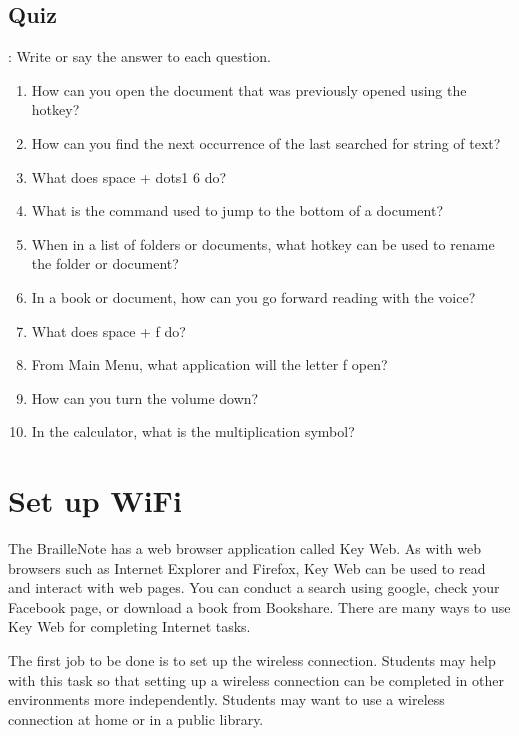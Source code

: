 \documentclass[10pt,letterpaper,twoside]{report}
\begin{document}
\subsection{Quiz}:
Write or say the answer to each question.
\begin{enumerate}
	\item How can you open the document that was previously opened using the hotkey?
	\item How can you find the next occurrence of the last searched for string of text?
	\item What does space + dots1 6 do?
	\item What is the command used to jump to the bottom of a document?
	\item When in a list of folders or documents, what hotkey can be used to rename the folder or document?
	\item In a book or document, how can you go forward reading with the voice?
	\item What does space + f do?
	\item From Main Menu, what application will the letter f open?
	\item How can you turn the volume down?
	\item In the calculator, what is the multiplication symbol?
\end{enumerate}
\clearpage
\section{Set up WiFi}
The BrailleNote has a web browser application called Key Web. As with web browsers such as Internet Explorer and Firefox, Key Web can be used to read and interact with web pages. You can conduct a search using google, check your Facebook page, or download a book from Bookshare. There are many ways to use Key Web for completing Internet tasks.

The first job to be done is to set up the wireless connection. Students may help with this task so that setting up a wireless connection can be completed in other environments more independently. Students may want to use a wireless connection at home or in a public library.
\end{document}
